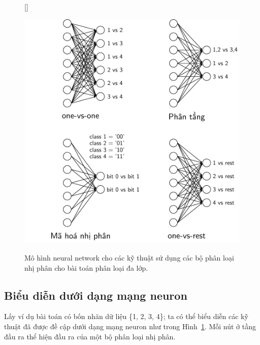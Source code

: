 \begin{figure}[t]
[\FBwidth]
{\caption{
Mô hình neural network cho các kỹ thuật sử dụng các bộ phân loại nhị phân
cho bài toán phân loại đa lớp.
}
\label{fig:12_6}}
{ %
\includegraphics[width=.63\textwidth]{Chapters/05_NeuralNetworks/12_binaryclassifiers/latex/binaryclassifiers.pdf}
}
\end{figure}
\subsection{Biểu diễn dưới dạng mạng neuron}
Lấy ví dụ bài toán có bốn nhãn dữ liệu \{1, 2, 3, 4\}; ta có thể biểu diễn các kỹ
thuật đã được đề cập dưới dạng mạng neuron như trong Hình~\ref{fig:12_6}. Mỗi nút ở tầng đầu ra thể hiện đầu ra của một bộ phân loại nhị phân.

